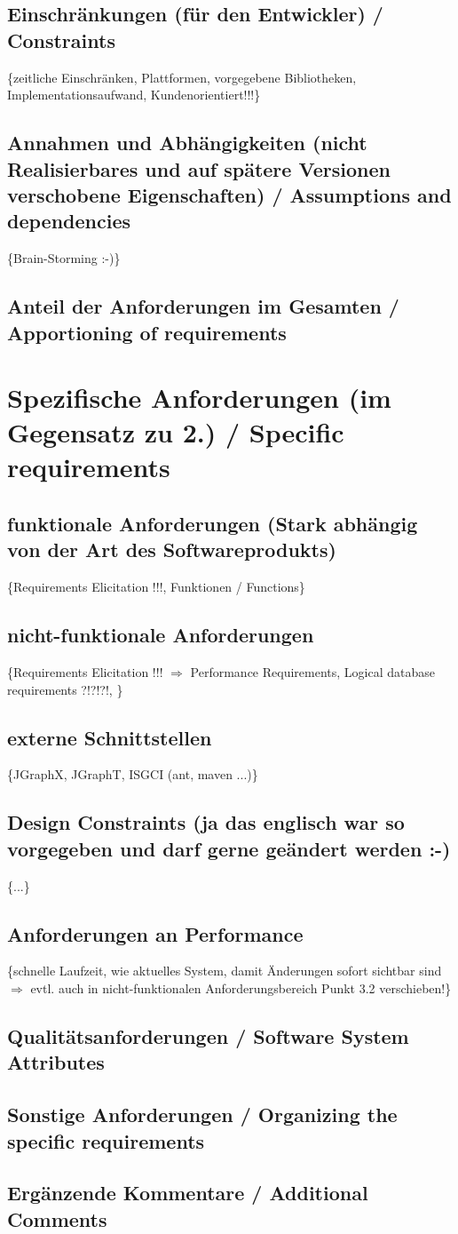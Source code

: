 \documentclass[11pt,a4paper]{article}
\begin{document}
	\subsection{Einschränkungen (für den Entwickler) / Constraints} %
	\{zeitliche Einschränken, Plattformen, vorgegebene Bibliotheken, Implementationsaufwand, Kundenorientiert!!!\}
	\subsection{Annahmen und Abhängigkeiten (nicht Realisierbares und auf spätere Versionen verschobene Eigenschaften) / Assumptions and dependencies} %
	\{Brain-Storming :-)\}
	\subsection{Anteil der Anforderungen im Gesamten / Apportioning of requirements} %

\newpage
\section{Spezifische Anforderungen (im Gegensatz zu 2.) / Specific requirements} %
	\subsection{funktionale Anforderungen (Stark abhängig von der Art des Softwareprodukts)} %
	\{Requirements Elicitation !!!, Funktionen / Functions\}
	\subsection{nicht-funktionale Anforderungen} %
	\{Requirements Elicitation !!! $\Longrightarrow$ Performance Requirements, Logical database requirements ?!?!?!, \}
	\subsection{externe Schnittstellen} %
	\{JGraphX, JGraphT, ISGCI (ant, maven ...)\}
	\subsection{Design Constraints (ja das englisch war so vorgegeben und darf gerne geändert werden :-)} %
	\{...\}
	\subsection{Anforderungen an Performance} %
	\{schnelle Laufzeit, wie aktuelles System, damit Änderungen sofort sichtbar sind $\Longrightarrow$ evtl. auch in nicht-funktionalen Anforderungsbereich Punkt 3.2 verschieben!\}
	\subsection{Qualitätsanforderungen / Software System Attributes} %
	\subsection{Sonstige Anforderungen / Organizing the specific requirements} %
	\subsection{Ergänzende Kommentare / Additional Comments} %
\end{document}
